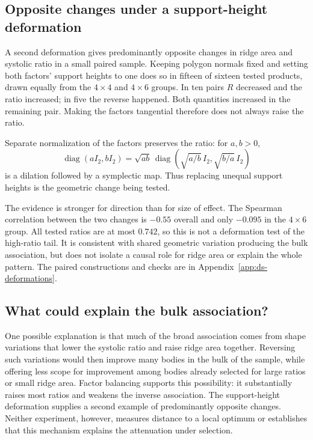 \subsection{Opposite changes under a support-height deformation}

A second deformation gives predominantly opposite changes in ridge
area and systolic ratio in a small paired sample. Keeping polygon normals fixed and setting both
factors' support heights to one does so in fifteen of sixteen tested
products, drawn equally from the $4\times4$ and $4\times6$ groups. In ten pairs $R$ decreased and the ratio increased; in five the
reverse happened. Both quantities increased in the remaining pair.
Making the factors tangential therefore does not always raise the ratio.

Separate normalization of the factors preserves the ratio: for $a,b>0$,
\[
 \operatorname{diag}(aI_2,bI_2)
 =\sqrt{ab}\,\operatorname{diag}(\sqrt{a/b}\,I_2,\sqrt{b/a}\,I_2)
\]
is a dilation followed by a symplectic map. Thus replacing unequal support
heights is the geometric change being tested.

The evidence is stronger for direction than for size of effect. The
Spearman correlation between the two changes is $-0.55$ overall and only
$-0.095$ in the $4\times6$ group. All tested ratios are at most $0.742$,
so this is not a deformation test of the high-ratio tail. It is consistent
with shared geometric variation producing the bulk association, but does
not isolate a causal role for ridge area or explain the whole pattern.
The paired constructions and checks are in
Appendix~\ref{app:ds-deformations}.

\subsection{What could explain the bulk association?}

One possible explanation is that much of the broad association comes
from shape variations that lower the systolic ratio and raise ridge area
together. Reversing such variations would then improve many bodies in
the bulk of the sample, while offering less scope for improvement among
bodies already selected for large ratios or small ridge area. Factor
balancing supports this possibility: it substantially raises most ratios
and weakens the inverse association. The support-height deformation
supplies a second example of predominantly opposite changes. Neither
experiment, however, measures distance to a local optimum or establishes
that this mechanism explains the attenuation under selection.

